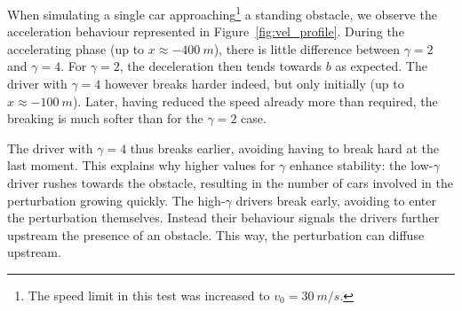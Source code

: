 When simulating a single car approaching\footnote{The speed limit in this test was increased to $v_0 = \SI{30}{m/s}$.} a standing obstacle, we observe the acceleration behaviour represented in Figure~\ref{fig:vel_profile}. During the accelerating phase (up to $x\approx\SI{-400}{m}$), there is little difference between $\gamma=2$ and $\gamma=4$. For $\gamma = 2$, the deceleration then tends towards $b$ as expected. The driver with $\gamma=4$ however breaks harder indeed, but only initially (up to $x\approx \SI{-100}{m}$). Later, having reduced the speed already more than required, the breaking is much softer than for the $\gamma=2$ case.

The driver with $\gamma=4$ thus breaks earlier, avoiding having to break hard at the last moment. This explains why higher values for $\gamma$ enhance stability: the low-$\gamma$ driver rushes towards the obstacle, resulting in the number of cars involved in the perturbation growing quickly. The high-$\gamma$ drivers break early, avoiding to enter the perturbation themselves. Instead their behaviour signals the drivers further upstream the presence of an obstacle. This way, the perturbation can diffuse upstream.

